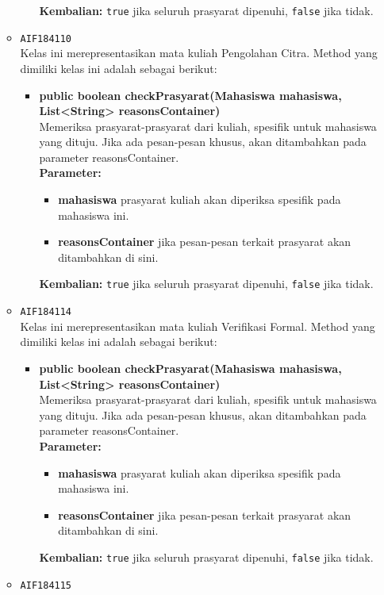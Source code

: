 \begin{enumerate}
\begin{itemize}
\begin{itemize}
\begin{itemize}
\end{itemize}
\textbf{Kembalian:} \texttt{true} jika seluruh prasyarat dipenuhi, \texttt{false} jika tidak.
\end{itemize}
\item \texttt{AIF184110} \\
Kelas ini merepresentasikan mata kuliah Pengolahan Citra. Method yang dimiliki kelas ini adalah sebagai berikut: 
\begin{itemize}
\item \textbf{public boolean checkPrasyarat(Mahasiswa mahasiswa, List<String> reasonsContainer)}\\
Memeriksa prasyarat-prasyarat dari kuliah, spesifik untuk mahasiswa yang dituju. Jika ada pesan-pesan khusus, akan ditambahkan pada parameter reasonsContainer.\\
\textbf{Parameter:}
\begin{itemize}
\item \textbf{mahasiswa} prasyarat kuliah akan diperiksa spesifik pada mahasiswa ini.
\item \textbf{reasonsContainer} jika pesan-pesan terkait prasyarat akan ditambahkan di sini.
\end{itemize}
\textbf{Kembalian:} \texttt{true} jika seluruh prasyarat dipenuhi, \texttt{false} jika tidak.
\end{itemize}
\item \texttt{AIF184114} \\
Kelas ini merepresentasikan mata kuliah Verifikasi Formal. Method yang dimiliki kelas ini adalah sebagai berikut: 
\begin{itemize}
\item \textbf{public boolean checkPrasyarat(Mahasiswa mahasiswa, List<String> reasonsContainer)}\\
Memeriksa prasyarat-prasyarat dari kuliah, spesifik untuk mahasiswa yang dituju. Jika ada pesan-pesan khusus, akan ditambahkan pada parameter reasonsContainer.\\
\textbf{Parameter:}
\begin{itemize}
\item \textbf{mahasiswa} prasyarat kuliah akan diperiksa spesifik pada mahasiswa ini.
\item \textbf{reasonsContainer} jika pesan-pesan terkait prasyarat akan ditambahkan di sini.
\end{itemize}
\textbf{Kembalian:} \texttt{true} jika seluruh prasyarat dipenuhi, \texttt{false} jika tidak.
\end{itemize}
\item \texttt{AIF184115} \\

\end{itemize}
\end{enumerate}
